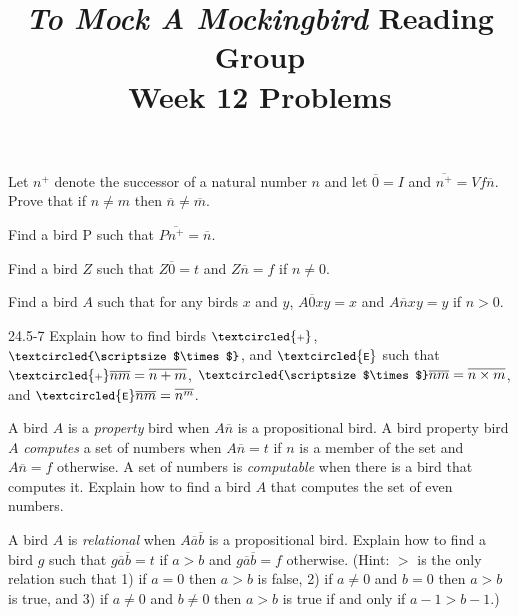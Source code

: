 \documentclass[12pt, letterpaper]{article}
\title{\emph{To Mock A Mockingbird} Reading Group\\Week 12 Problems}
\begin{document}
\maketitle

\disclaimer

\begin{prob}{24.1}
Let $n^+$ denote the successor of a natural number $n$ and let $\overline{0} = I$ and $\overline{n^+} = Vf\overline{n}$. Prove that if $n \neq m$ then $\overline{n} \neq \overline{m}$. 
\end{prob}

\begin{prob}{24.2}
Find a bird P such that $P\overline{n^+} = \overline{n}$.
\end{prob}

\begin{prob}{24.3}
Find a bird $Z$ such that $Z\overline{0} = t$ and $Z\overline{n} = f$ if $n \neq 0$. 
\end{prob}

\begin{prob}{24.4}
Find a bird $A$ such that for any birds $x$ and $y$, $A\overline{0}xy = x$ and $A\overline{n}xy = y$ if $n > 0$. 
\end{prob}

\begin{prob}{24.5-7}
Explain how to find birds $\small \textcircled{\scriptsize \textsf{+}}$, $\small \textcircled{\scriptsize $\times$}$, and $\small \textcircled{\scriptsize \textsf{E}}$ such that $\small \textcircled{\scriptsize \textsf{+}} \overline{n} \overline{m} = \overline{n + m}$, $\small \textcircled{\scriptsize $\times$}\overline{n}\overline{m} = \overline{n \times m}$, and $\small \textcircled{\scriptsize \textsf{E}}\overline{n}\overline{m} = \overline{n^m}$.
\end{prob}

\begin{prob}{24.8}
A bird $A$ is a \emph{property} bird when $A\overline{n}$ is a propositional bird. A bird property bird $A$ \emph{computes} a set of numbers when $A\overline{n} = t$ if $n$ is a member of the set and $A\overline{n} = f$ otherwise. A set of numbers is \emph{computable} when there is a bird that computes it. Explain how to find a bird $A$ that computes the set of even numbers.
\end{prob}

\begin{prob}{24.9}
A bird $A$ is \emph{relational} when $A\overline{a}\overline{b}$ is a propositional bird. Explain how to find a bird $g$ such that $g\overline{a}\overline{b} = t$ if $a > b$ and $g\overline{a}\overline{b} = f$ otherwise. (Hint: $>$ is the only relation such that 1) if $a = 0$ then $a > b$ is false, 2) if $a \neq 0$ and $b = 0$ then $a > b$ is true, and 3) if $a \neq 0$ and $b \neq 0$ then $a > b$ is true if and only if $a - 1 > b - 1$.)
\end{prob}
\end{document}
